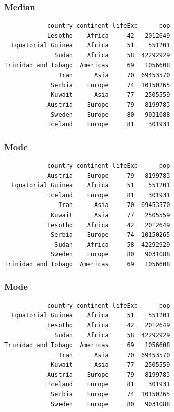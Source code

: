 \documentclass[17pt]{beamer} %
\begin{document}
\begin{frame}[fragile]
\frametitle{Median}
\begin{verbatim}
            country continent lifeExp      pop
            Lesotho    Africa     42   2012649
  Equatorial Guinea    Africa     51    551201
              Sudan    Africa     58  42292929
Trinidad and Tobago  Americas     69   1056608
               Iran      Asia     70  69453570
             Serbia    Europe     74  10150265
             Kuwait      Asia     77   2505559
            Austria    Europe     79   8199783
             Sweden    Europe     80   9031088
            Iceland    Europe     81    301931
\end{verbatim}
\end{frame}



\begin{frame}[fragile]
\frametitle{Mode}
\begin{verbatim}
            country continent lifeExp      pop
            Austria    Europe     79   8199783
  Equatorial Guinea    Africa     51    551201
            Iceland    Europe     81    301931
               Iran      Asia     70  69453570
             Kuwait      Asia     77   2505559
            Lesotho    Africa     42   2012649
             Serbia    Europe     74  10150265
              Sudan    Africa     58  42292929
             Sweden    Europe     80   9031088
Trinidad and Tobago  Americas     69   1056608
\end{verbatim}
\end{frame}

\begin{frame}[fragile]
\frametitle{Mode}
\begin{verbatim}
            country continent lifeExp      pop
  Equatorial Guinea    Africa     51    551201
            Lesotho    Africa     42   2012649
              Sudan    Africa     58  42292929
Trinidad and Tobago  Americas     69   1056608
               Iran      Asia     70  69453570
             Kuwait      Asia     77   2505559
            Austria    Europe     79   8199783
            Iceland    Europe     81    301931
             Serbia    Europe     74  10150265
             Sweden    Europe     80   9031088
\end{verbatim}
\end{frame}


\end{document}
